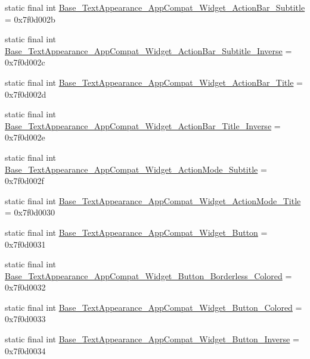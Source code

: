 \begin{DoxyCompactItemize}
\item 
static final int \mbox{\hyperlink{classcom_1_1synnapps_1_1carouselview_1_1_r_1_1style_a1e5e6716559a733115ab100d1ca02ffd}{Base\+\_\+\+Text\+Appearance\+\_\+\+App\+Compat\+\_\+\+Widget\+\_\+\+Action\+Bar\+\_\+\+Subtitle}} = 0x7f0d002b
\item 
static final int \mbox{\hyperlink{classcom_1_1synnapps_1_1carouselview_1_1_r_1_1style_a287b0899de9f0162a660c0b1dc8c7cd4}{Base\+\_\+\+Text\+Appearance\+\_\+\+App\+Compat\+\_\+\+Widget\+\_\+\+Action\+Bar\+\_\+\+Subtitle\+\_\+\+Inverse}} = 0x7f0d002c
\item 
static final int \mbox{\hyperlink{classcom_1_1synnapps_1_1carouselview_1_1_r_1_1style_a55bc9cb3bfe8759045455c2877af56c8}{Base\+\_\+\+Text\+Appearance\+\_\+\+App\+Compat\+\_\+\+Widget\+\_\+\+Action\+Bar\+\_\+\+Title}} = 0x7f0d002d
\item 
static final int \mbox{\hyperlink{classcom_1_1synnapps_1_1carouselview_1_1_r_1_1style_aaa2cee65e47198d5701fe0755e291a1a}{Base\+\_\+\+Text\+Appearance\+\_\+\+App\+Compat\+\_\+\+Widget\+\_\+\+Action\+Bar\+\_\+\+Title\+\_\+\+Inverse}} = 0x7f0d002e
\item 
static final int \mbox{\hyperlink{classcom_1_1synnapps_1_1carouselview_1_1_r_1_1style_af4710c820bf304b06094f53102164c48}{Base\+\_\+\+Text\+Appearance\+\_\+\+App\+Compat\+\_\+\+Widget\+\_\+\+Action\+Mode\+\_\+\+Subtitle}} = 0x7f0d002f
\item 
static final int \mbox{\hyperlink{classcom_1_1synnapps_1_1carouselview_1_1_r_1_1style_a30709686dc5bf6a96b8f8a40b7cf11d7}{Base\+\_\+\+Text\+Appearance\+\_\+\+App\+Compat\+\_\+\+Widget\+\_\+\+Action\+Mode\+\_\+\+Title}} = 0x7f0d0030
\item 
static final int \mbox{\hyperlink{classcom_1_1synnapps_1_1carouselview_1_1_r_1_1style_a5e9ed969c6372b4cd015d0cafe602a50}{Base\+\_\+\+Text\+Appearance\+\_\+\+App\+Compat\+\_\+\+Widget\+\_\+\+Button}} = 0x7f0d0031
\item 
static final int \mbox{\hyperlink{classcom_1_1synnapps_1_1carouselview_1_1_r_1_1style_a9a8f341ec6fcd47a67243d1f1a23a9fb}{Base\+\_\+\+Text\+Appearance\+\_\+\+App\+Compat\+\_\+\+Widget\+\_\+\+Button\+\_\+\+Borderless\+\_\+\+Colored}} = 0x7f0d0032
\item 
static final int \mbox{\hyperlink{classcom_1_1synnapps_1_1carouselview_1_1_r_1_1style_a41fa7a9f1f915178b3dec44c34a4df23}{Base\+\_\+\+Text\+Appearance\+\_\+\+App\+Compat\+\_\+\+Widget\+\_\+\+Button\+\_\+\+Colored}} = 0x7f0d0033
\item 
static final int \mbox{\hyperlink{classcom_1_1synnapps_1_1carouselview_1_1_r_1_1style_a11be0285e72914527ab856336af06871}{Base\+\_\+\+Text\+Appearance\+\_\+\+App\+Compat\+\_\+\+Widget\+\_\+\+Button\+\_\+\+Inverse}} = 0x7f0d0034

\end{DoxyCompactItemize}
